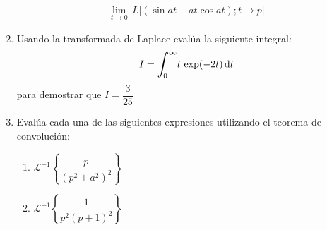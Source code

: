 \begin{enumerate}
\begin{align*}
\lim_{t \to 0} \, L \big[ (\sin a t - a t \cos a t ); t \to p \big]
\end{align*}
\item Usando la transformada de Laplace evalúa la siguiente integral:
\begin{align*}
I = \scaleint{6ex}_{\bs 0}^{\infty} t \, \exp (- 2 t) \dd{t}
\end{align*}
para demostrar que $I = \dfrac{3}{25}$
\item Evalúa cada una de las siguientes expresiones utilizando el teorema de convolución:
\begin{enumerate}
\item $\mathcal{L}^{-1} \left\{ \dfrac{p}{(p^{2} + a^{2})^{2}} \right\}$
\item $\mathcal{L}^{-1} \left\{ \dfrac{1}{p^{2} (p + 1)^{2}} \right\}$
\end{enumerate}
\end{enumerate}
